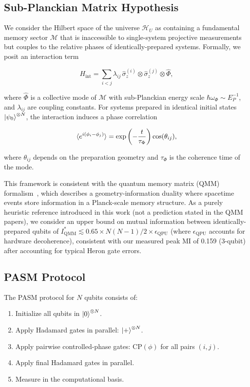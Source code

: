 ﻿\documentclass[12pt,a4paper]{article}
\begin{document}
\subsection{Sub-Planckian Matrix Hypothesis}

We consider the Hilbert space of the universe $\mathcal{H}_U$ as containing a fundamental memory sector $\mathcal{M}$ that is inaccessible to single-system projective measurements but couples to the relative phases of identically-prepared systems. Formally, we posit an interaction term

\begin{equation}
H_{\text{int}} = \sum_{i<j} \lambda_{ij} \, \hat{\sigma}^{(i)}_z \otimes \hat{\sigma}^{(j)}_z \otimes \hat{\Phi},
\end{equation}

where $\hat{\Phi}$ is a collective mode of $\mathcal{M}$ with sub-Planckian energy scale $\hbar\omega_\Phi \sim E_P^{-1}$, and $\lambda_{ij}$ are coupling constants. For systems prepared in identical initial states $\ket{\psi_0}^{\otimes N}$, the interaction induces a phase correlation

\begin{equation}
\braket{e^{i(\phi_i - \phi_j)}} = \exp\left(-\frac{t}{\tau_\Phi}\right) \cos(\theta_{ij}),
\end{equation}

where $\theta_{ij}$ depends on the preparation geometry and $\tau_\Phi$ is the coherence time of the mode.

This framework is consistent with the quantum memory matrix (QMM) formalism~\cite{neukart2025}, which describes a geometry-information duality where spacetime events store information in a Planck-scale memory structure. As a purely heuristic reference introduced in this work (not a prediction stated in the QMM papers), we consider an upper bound on mutual information between identically-prepared qubits of $I_{\text{QMM}}^{*} \lesssim 0.65 \times N(N-1)/2 \times \epsilon_{\text{QPU}}$ (where $\epsilon_{\text{QPU}}$ accounts for hardware decoherence), consistent with our measured peak MI of 0.159 (3-qubit) after accounting for typical Heron gate errors.

\subsection{PASM Protocol}

The PASM protocol for $N$ qubits consists of:

\begin{enumerate}
    \item Initialize all qubits in $\ket{0}^{\otimes N}$.
    \item Apply Hadamard gates in parallel: $\ket{+}^{\otimes N}$.
    \item Apply pairwise controlled-phase gates: $\text{CP}(\phi)$ for all pairs $(i,j)$.
    \item Apply final Hadamard gates in parallel.
    \item Measure in the computational basis.
\end{enumerate}
\end{document}
